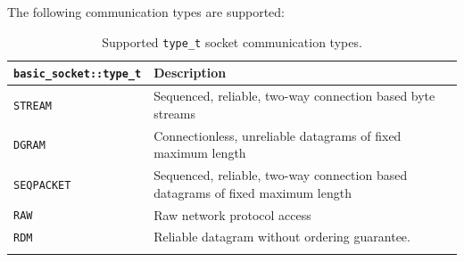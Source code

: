 \documentclass[10pt,a4paper,openany]{mudbook}
\begin{document}
The following communication types are supported:
\begin{longtable}{l|p{}}
  \textbf{\texttt{basic\_socket::type\_t}} & \textbf{Description}  \\
  \hline
  \texttt{STREAM} & Sequenced, reliable, two-way connection based byte
          streams  \\
  \texttt{DGRAM} & Connectionless, unreliable datagrams of fixed
          maximum length  \\
  \texttt{SEQPACKET} & Sequenced, reliable, two-way connection based
          datagrams of fixed maximum length  \\
  \texttt{RAW} & Raw network protocol access  \\
  \texttt{RDM} & Reliable datagram without ordering guarantee.  \\
  \caption{Supported \texttt{type\_t} socket communication types.}
  \label{tbl:type_t}
\end{longtable}
\end{document}
